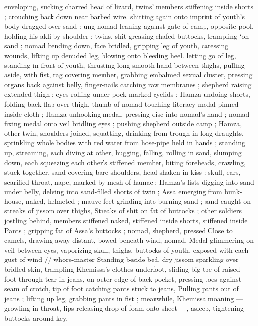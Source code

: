enveloping, sucking charred head of lizard, twins' members 
stiffening inside shorts ; crouching back down near barbed wire. 
shitting again onto imprint of youth's body dragged over sand : 
ung nomad leaning against gate of camp, opposite pool, holding 
his akli by shoulder ; twins, shit greasing chafed buttocks, trampling 
‘on sand ; nomad bending down, face bridled, gripping leg of youth, 
caressing wounds, lifting up denuded leg, blowing onto bleeding 
heel. letting go of leg, standing in front of youth, thrusting long 
smooth hand between thighs, pulling aside, with fist, rag covering 
member, grabbing embalmed sexual cluster, pressing organs back 
against belly, finger-nails catching raw membranes ; shepherd raising 
extended thigh ; eyes rolling under pock-marked eyelids ; Hamza 
undoing shorts, folding back flap over thigh, thumb of nomad 
touching literacy-medal pinned inside cloth ; Hamza unhooking 
medal, pressing disc into nomad's hand ; nomad fixing medal onto 
veil bridling eyes ; pushing shepherd outside camp ; Hamza, other 
twin, shoulders joined, squatting, drinking from trough in long 
draughts, sprinkling whole bodies with red water from hose-pipe held 
in hands ; standing up, streaming, each diving at other, hugging, 
falling, rolling in sand, slumping down, each squeezing each other's 
stiffened member, biting foreheads, crawling, stuck together, sand 
covering bare shoulders, head shaken in kiss : skull, ears, scarified 
throat, nape, marked by mesh of hamac ; Hamza's fists digging into 
sand under belly, delving into sand-filled shorts of twin ; Assa 
emerging from bunk-house, naked, helmeted ; mauve feet grinding 
into burning sand ; sand caught on streaks of jissom over thighs, 
Streaks of shit on fat of buttocks ; other soldiers jostling behind, 
members stiffened naked, stiffened inside shorts, stiffened inside 
Pants ; gripping fat of Assa's buttocks ; nomad, shepherd, pressed 
Close to camels, drawing away distant, bowed beneath wind, nomad, 
Medal glimmering on veil between eyes, vaporizing skull, thighs, 
buttocks of youth, exposed with each gust of wind {\slash}{\slash} whore-master 
Standing beside bed, dry jissom sparkling over bridled skin, 
trampling Khemissa's clothes underfoot, sliding big toe of raised foot 
through tear in jeans, on outer edge of back pocket, pressing toes 
against seam of crotch, tip of foot catching pants stuck to jeans, 
Pulling pants out of jeans ; lifting up leg, grabbing pants in fist ; 
meanwhile, Khemissa moaning --- growling in throat, lips releasing 
drop of foam onto sheet ---, asleep, tightening buttocks around key. 

